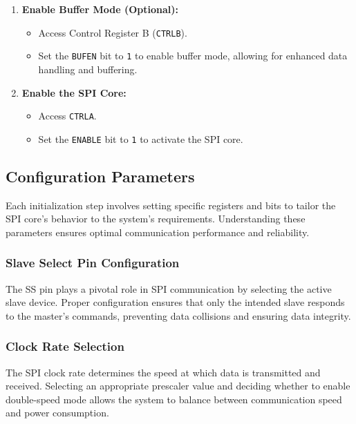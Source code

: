 \documentclass{article}
\begin{document}
\begin{enumerate}
    \item \textbf{Enable Buffer Mode (Optional):}
    \begin{itemize}
        \item Access Control Register B (\texttt{CTRLB}).
        \item Set the \texttt{BUFEN} bit to \texttt{1} to enable buffer mode, allowing for enhanced data handling and buffering.
    \end{itemize}
    
    \item \textbf{Enable the SPI Core:}
    \begin{itemize}
        \item Access \texttt{CTRLA}.
        \item Set the \texttt{ENABLE} bit to \texttt{1} to activate the SPI core.
    \end{itemize}
\end{enumerate}


\subsection{Configuration Parameters}
Each initialization step involves setting specific registers and bits to tailor the SPI core's behavior to the system's requirements. Understanding these parameters ensures optimal communication performance and reliability.

\subsubsection{Slave Select Pin Configuration}
The SS pin plays a pivotal role in SPI communication by selecting the active slave device. Proper configuration ensures that only the intended slave responds to the master's commands, preventing data collisions and ensuring data integrity.

\subsubsection{Clock Rate Selection}
The SPI clock rate determines the speed at which data is transmitted and received. Selecting an appropriate prescaler value and deciding whether to enable double-speed mode allows the system to balance between communication speed and power consumption.
\end{document}
